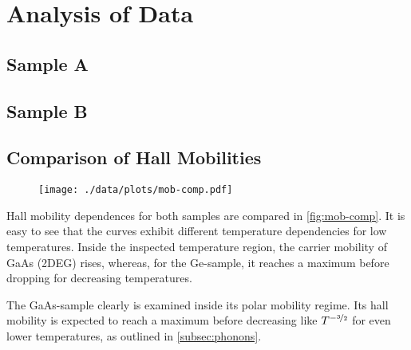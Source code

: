 \chapter{Analysis of Data}

\section{Sample A}

\section{Sample B}

\section{Comparison of Hall Mobilities}
\begin{figure}
  \centering
  \texttt{[image: ./data/plots/mob-comp.pdf]}
  \label{fig:mob-comp}
\end{figure}

Hall mobility dependences for both samples are compared in \autoref{fig:mob-comp}.
It is easy to see that the curves exhibit different temperature dependencies for low temperatures.
Inside the inspected temperature region, the carrier mobility of GaAs (2DEG) rises, whereas, for the Ge-sample, it reaches a maximum before dropping for decreasing temperatures.

The GaAs-sample clearly is examined inside its polar mobility regime. Its hall mobility is expected to reach a maximum before decreasing like $T^{-\nicefrac{3}{2}}$ for even lower temperatures, as outlined in \autoref{subsec:phonons}. 
